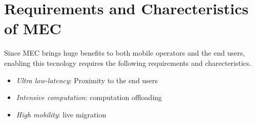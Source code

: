 \section{Requirements and Charecteristics of MEC}  \label{requirements}

Since MEC brings huge benefits to both mobile operators and the end users, enabling this tecnology requires the following requirements and charecteristics.

\begin{itemize}

\item \textit{\textit{Ultra low-latency}}: Proximity to the end users

\item \textit{\textit{Intensive computation}}: computation offloading

\item \textit{\textit{High mobility}}: live migration

\end{itemize}
